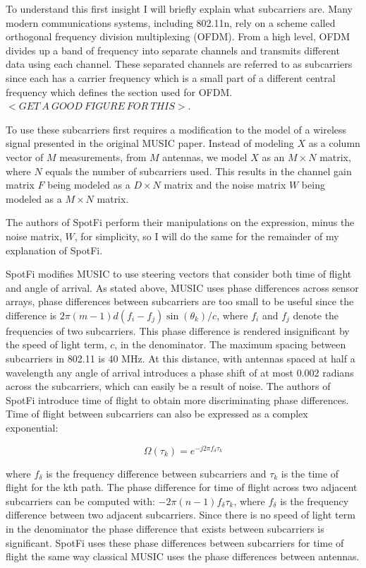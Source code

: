 \documentclass[12pt]{report}
\begin{document}
To understand this first insight I will briefly explain what subcarriers are. Many modern communications systems, including 802.11n, rely on a scheme called orthogonal frequency division multiplexing (OFDM). From a high level, OFDM divides up a band of frequency into separate channels and transmits different data using each channel. These separated channels are referred to as subcarriers since each has a carrier frequency which is a small part of a different central frequency which defines the section used for OFDM.  $<GET \: A \: GOOD \: FIGURE \: FOR \: THIS>$. \par

To use these subcarriers first requires a modification to the model of a wireless signal presented in the original MUSIC paper. Instead of modeling $X$ as a column vector of $M$ measurements, from $M$ antennas, we model $X$ as an $M \times N$ matrix, where $N$ equals the number of subcarriers used. This results in the channel gain matrix $F$ being modeled as a $D \times N$ matrix and the noise matrix $W$ being modeled as a $M \times N$ matrix. \par

The authors of SpotFi perform their manipulations on the expression, minus the noise matrix, $W$, for simplicity, so I will do the same for the remainder of my explanation of SpotFi. \par

SpotFi modifies MUSIC to use steering vectors that consider both time of flight and angle of arrival. As stated above, MUSIC uses phase differences across sensor arrays, phase differences between subcarriers are too small to be useful since the difference is $2 \pi (m - 1) d (f_i - f_j) \sin(\theta_k) / c$, where $f_i$ and $f_j$ denote the frequencies of two subcarriers. This phase difference is rendered insignificant by the speed of light term, $c$, in the denominator. The maximum spacing between subcarriers in 802.11 is 40 MHz. At this distance, with antennas spaced at half a wavelength any angle of arrival introduces a phase shift of at most 0.002 radians across the subcarriers, which can easily be a result of noise. The authors of SpotFi introduce time of flight to obtain more discriminating phase differences. Time of flight between subcarriers can also be expressed as a complex exponential:

$$\Omega(\tau_{k}) = e^{-j 2 \pi f_{\delta} \tau_k }$$

where $f_{\delta}$ is the frequency difference between subcarriers and $\tau_{k}$ is the time of flight for the kth path. The phase difference for time of flight across two adjacent subcarriers can be computed with: $-2 \pi (n - 1) f_{\delta} \tau_k$, where $f_{\delta}$ is the frequency difference between two adjacent subcarriers. Since there is no speed of light term in the denominator the phase difference that exists between subcarriers is significant. SpotFi uses these phase differences between subcarriers for time of flight the same way classical MUSIC uses the phase differences between antennas. \par
\end{document}

